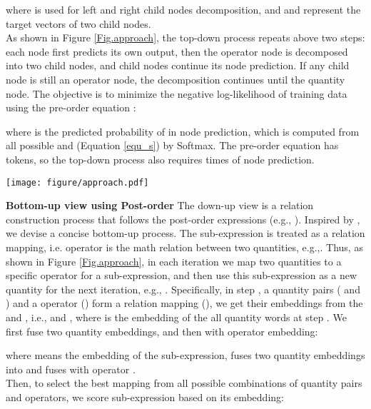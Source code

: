 \documentclass[11pt]{article}
\begin{document}
where  is used for left and right child nodes decomposition, and  and  represent the target vectors of two child nodes.\\
\indent As shown in Figure \ref{Fig.approach}, the top-down process repeats above two steps: each node first predicts its own output, then the operator node is decomposed into two child nodes, and child nodes continue its node prediction. If any child node is still an operator node, the decomposition continues until the quantity node. The objective is to minimize the negative log-likelihood of training data  using the pre-order equation :

where  is the predicted probability of  in node prediction, which is computed from all possible  and  (Equation \ref{equ_s}) by Softmax. The pre-order equation has  tokens, so the top-down process also requires  times of node prediction.\\ 
\begin{figure*}[htbp] \centering \texttt{[image: figure/approach.pdf]} \caption{We align multi-view reasoning through consistent contrastive learning. Firstly, we obtain three global shared embeddings () from the text encoder. Then, top-down process constantly decomposes global goals, while bottom-up process continuously constructs local relations. Both views produce intermediate sub-expressions. These sub-expression representations are aligned using multi-granularity contrastive learning.} \label{Fig.approach} \end{figure*}
\indent \textbf{Bottom-up view using Post-order} 
The down-up view is a relation construction process that follows the post-order expressions  (e.g., ). Inspired by \citet{jie2022learning}, we devise a concise bottom-up process. The sub-expression is treated as a relation mapping, i.e. operator is the math relation between two quantities, e.g.,. Thus, as shown in Figure \ref{Fig.approach}, in each iteration we map two quantities to a specific operator for a sub-expression, and then use this sub-expression as a new quantity for the next iteration, e.g., . Specifically, in step , a quantity pairs ( and ) and a operator () form a relation mapping (), we get their embeddings from the  and , i.e., and , where  is the embedding of the all quantity words at step . We first fuse two quantity embeddings, and then with operator embedding:

where  means the embedding of the sub-expression,  fuses two quantity embeddings into  and  fuses  with operator .\\ 
\indent Then, to select the best mapping from all possible combinations of quantity pairs and operators, we score sub-expression based on its embedding:
\end{document}
